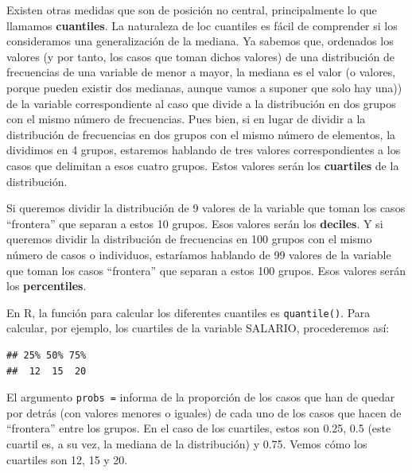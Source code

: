\documentclass[
]{book}
\newenvironment{Shaded}{\begin{snugshade}}{\end{snugshade}}
\newcommand{\AttributeTok}[1]{\textcolor[rgb]{0.13,0.29,0.53}{#1}}
\newcommand{\CommentTok}[1]{\textcolor[rgb]{0.56,0.35,0.01}{\textit{#1}}}
\newcommand{\FloatTok}[1]{\textcolor[rgb]{0.00,0.00,0.81}{#1}}
\newcommand{\FunctionTok}[1]{\textcolor[rgb]{0.13,0.29,0.53}{\textbf{#1}}}
\newcommand{\NormalTok}[1]{#1}
\newcommand{\OtherTok}[1]{\textcolor[rgb]{0.56,0.35,0.01}{#1}}
\newcommand{\SpecialCharTok}[1]{\textcolor[rgb]{0.81,0.36,0.00}{\textbf{#1}}}
\begin{document}
Existen otras medidas que son de posición no central, principalmente lo que llamamos \textbf{cuantiles}.
La naturaleza de loc cuantiles es fácil de comprender si los consideramos una generalización de la mediana.
Ya sabemos que, ordenados los valores (y por tanto, los casos que toman dichos valores) de una distribución de frecuencias de una variable de menor a mayor, la mediana es el valor (o valores, porque pueden existir dos medianas, aunque vamos a suponer que solo hay una)) de la variable correspondiente al caso que divide a la distribución en dos grupos con el mismo número de frecuencias.
Pues bien, si en lugar de dividir a la distribución de frecuencias en dos grupos con el mismo número de elementos, la dividimos en 4 grupos, estaremos hablando de tres valores correspondientes a los casos que delimitan a esos cuatro grupos.
Estos valores serán los \textbf{cuartiles} de la distribución.

Si queremos dividir la distribución de 9 valores de la variable que toman los casos ``frontera'' que separan a estos 10 grupos.
Esos valores serán los \textbf{deciles}.
Y si queremos dividir la distribución de frecuencias en 100 grupos con el mismo número de casos o individuos, estaríamos hablando de 99 valores de la variable que toman los casos ``frontera'' que separan a estos 100 grupos.
Esos valores serán los \textbf{percentiles}.

En R, la función para calcular los diferentes cuantiles es \texttt{quantile()}.
Para calcular, por ejemplo, los cuartiles de la variable SALARIO, procederemos así:

\begin{Shaded}
\end{Shaded}

\begin{verbatim}
## 25% 50% 75% 
##  12  15  20
\end{verbatim}

El argumento \texttt{probs\ =} informa de la proporción de los casos que han de quedar por detrás (con valores menores o iguales) de cada uno de los casos que hacen de ``frontera'' entre los grupos.
En el caso de los cuartiles, estos son 0.25, 0.5 (este cuartil es, a su vez, la mediana de la distribución) y 0.75.
Vemos cómo los cuartiles son 12, 15 y 20.
\end{document}
